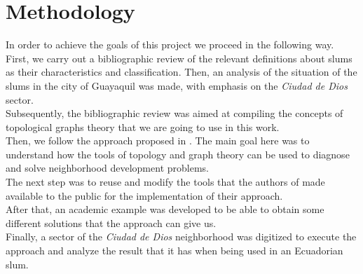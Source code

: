 \documentclass[10pt]{article}
\begin{document}
\section{Methodology}
In order to achieve the goals of this project we proceed in the following way.\\

First, we carry out a bibliographic review of the relevant definitions about slums as their characteristics and classification. Then, an analysis of the situation of the slums in the city of Guayaquil was made, with emphasis on the \emph{Ciudad de Dios} sector.\\

Subsequently, the bibliographic review was aimed at compiling the concepts of topological graphs theory that we are going to use in this work.\\

Then, we follow the approach proposed in \cite{bre}. The main goal here was to understand how the tools of topology and graph theory can be used to diagnose and solve neighborhood development problems.\\

The next step was to reuse and modify the tools that the authors of \cite{bre} made available to the public for the implementation of their approach.\\

After that, an academic example was developed to be able to obtain some different solutions that the approach can give us.\\

Finally, a sector of the \emph{Ciudad de Dios} neighborhood was digitized to execute the approach and analyze the result that it has when being used in an Ecuadorian slum.\\

\end{document}
